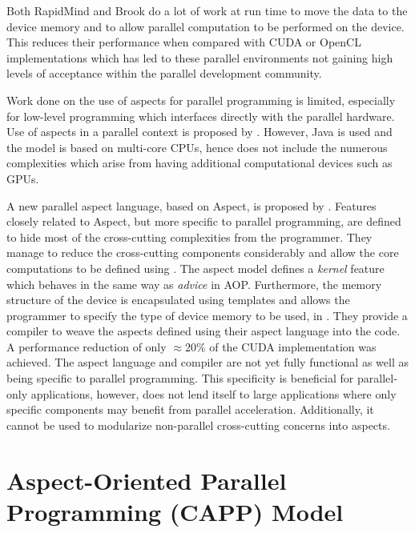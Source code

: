 \documentclass{sig-alternate-05-2015}
\begin{document}
Both RapidMind and Brook do a lot of work at run time to move the data to 
the device memory and to allow parallel computation to be performed on the
device. This
reduces their performance when compared with CUDA or OpenCL implementations 
\cite{rmindperf} which has led to these parallel environments not
gaining high levels of acceptance within the parallel development community.

Work done on the use of aspects for parallel programming is limited, especially
for low-level programming which interfaces directly with the parallel hardware.
Use of aspects in a parallel context is proposed by \cite{jaspect}.
However, Java is used and the model is based on multi-core CPUs, hence does not include the
numerous complexities which arise from having additional computational devices such
as GPUs.

A new parallel aspect language, based on Aspect\CPP, is proposed by
\cite{wang:aosp}. Features closely related to Aspect\CPP, but more specific to
parallel programming, are defined to hide most of the cross-cutting complexities from the
programmer. They manage to reduce the cross-cutting components considerably
and allow the core computations to be defined using \CPP. The aspect model defines 
a \textit{kernel} feature which behaves in the same way as \textit{advice} in AOP. 
Furthermore, the memory structure of the device is encapsulated using templates and allows the
programmer to specify the type of device memory to be used, in \CPP. They
provide a compiler to weave the aspects defined using their aspect language into 
the \CPP code. A performance reduction of only $\approx$20$\%$ of the CUDA
implementation was achieved. 
The aspect language and compiler are not yet fully functional as well as being
specific to parallel programming. This specificity is beneficial for parallel-only 
applications, however, does not lend itself to large \CPP applications
where only specific components may benefit from parallel acceleration.
Additionally, it cannot be used to modularize non-parallel cross-cutting concerns into
aspects.

\section{\CPP Aspect-Oriented Parallel \\ Programming (CAPP) Model}\label{sec:aspects}
\end{document}
